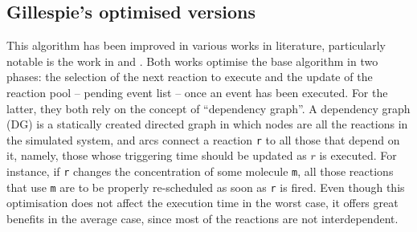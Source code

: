 \documentclass[12pt,a4paper,twoside,openright]{book}
\begin{document}
\subsection{Gillespie's optimised versions}
This algorithm has been improved in various works in literature, particularly notable is the work in \cite{gibson2000} and \cite{slepoy2008}.
%
Both works optimise the base algorithm in two phases: the selection of the next reaction to execute and the update of the reaction pool -- pending event list -- once an event has been executed.
%
For the latter, they both rely on the concept of ``dependency graph''.
%
A dependency graph (DG) is a statically created directed graph in which nodes are all the reactions in the simulated system, and arcs connect a reaction \texttt{r} to all those that depend on it, namely, those whose triggering time should be updated as $r$ is executed.
%
For instance, if \texttt{r} changes the concentration of some molecule \texttt{m}, all those reactions that use \texttt{m} are to be properly re-scheduled as soon as \texttt{r} is fired.
%
Even though this optimisation does not affect the execution time in the worst case, it offers great benefits in the average case, since most of the reactions are not interdependent.
\end{document}
